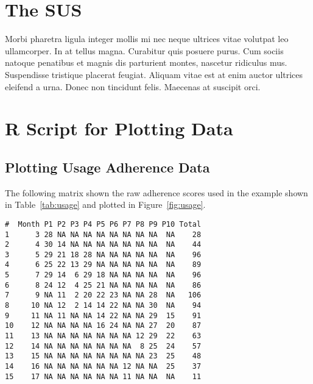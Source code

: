 
\chapter{The \acf{SUS}}
\label{app:sus}

Morbi pharetra ligula integer mollis mi nec neque ultrices vitae volutpat leo ullamcorper. In at tellus magna. Curabitur quis posuere purus. Cum sociis natoque penatibus et magnis dis parturient montes, nascetur ridiculus mus. Suspendisse tristique placerat feugiat. Aliquam vitae est at enim auctor ultrices eleifend a urna. Donec non tincidunt felis. Maecenas at suscipit orci.

\chapter{R Script for Plotting Data}
\label{app:r_script}

\section{Plotting Usage Adherence Data}

The following matrix shown the raw adherence scores used in the example shown in Table~\ref{tab:usage} and plotted in Figure~\ref{fig:usage}.

\begin{verbatim}
#  Month P1 P2 P3 P4 P5 P6 P7 P8 P9 P10 Total
1      3 28 NA NA NA NA NA NA NA NA  NA    28
2      4 30 14 NA NA NA NA NA NA NA  NA    44
3      5 29 21 18 28 NA NA NA NA NA  NA    96
4      6 25 22 13 29 NA NA NA NA NA  NA    89
5      7 29 14  6 29 18 NA NA NA NA  NA    96
6      8 24 12  4 25 21 NA NA NA NA  NA    86
7      9 NA 11  2 20 22 23 NA NA 28  NA   106
8     10 NA 12  2 14 14 22 NA NA 30  NA    94
9     11 NA 11 NA NA 14 22 NA NA 29  15    91
10    12 NA NA NA NA 16 24 NA NA 27  20    87
11    13 NA NA NA NA NA NA NA 12 29  22    63
12    14 NA NA NA NA NA NA NA  8 25  24    57
13    15 NA NA NA NA NA NA NA NA 23  25    48
14    16 NA NA NA NA NA NA 12 NA NA  25    37
15    17 NA NA NA NA NA NA 11 NA NA  NA    11
\end{verbatim}

